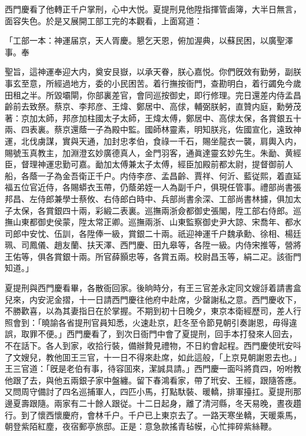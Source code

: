 西門慶看了他轉正千户掌刑，心中大悦。夏提刑見他陞指揮管鹵簿，大半日無言，面容失色。於是又展開工部工完的本觀看，上面寫道：

\begin{myquote}[\markfont]
「工部一本：神運届京，天人胥慶。懇乞天恩，俯加渥典，以蘇民困，以廣聖澤事。奉

聖旨，這神運奉迎大内，奠安艮嶽，以承天眷，朕心嘉悦。你們旣效有勤勞，副朕事玄至意，所經過地方，委的小民困苦。着行撫按衙門，查勘明白，着行蠲免今歲田租之半。所毀壩閘，你部裏差官，會同巡按御史，即行修理。完日還差内侍孟昌齡前去致祭。蔡京、李邦彦、王煒、鄭居中、高俅，輔弼朕躬，直贊内庭，勳勞茂著：京加太師，邦彦加柱國太子太師，王煒太傅，鄭居中、高俅太保，各賞銀五十兩、四表裏。蔡京還蔭一子為殿中監。國師林靈素，明知朕兆，佐國宣化，遠致神運，北伐虜謀，實與天通，加封忠孝伯，食祿一千石，賜坐龍衣一襲，肩輿入内，賜號玉真教主，加淵澄玄妙廣德真人，金門羽客，通眞達靈玄妙先生。朱勔、黄經臣，督理神運忠勤可嘉。勔加太傅兼太子太傅，經臣加殿前都太尉，提督御前人船，各蔭一子為金吾衛正千户。内侍李彦、孟昌齡、賈祥、何沂、藍従熙，着直延福五位官近侍，各賜蟒衣玉帶，仍蔭弟姪一人為副千户，俱現任管事。禮部尚書張邦昌、左侍郎兼學士蔡攸、右侍郎白時中、兵部尚書余深、工部尚書林攄，俱加太子太保，各賞銀四十兩，彩緞二表裏。巡撫兩浙僉都御史張閣，陞工部右侍郎。巡撫山東都御史侯蒙，陞太常正卿。巡撫兩浙、山東監察御史尹大諒、宋喬年、都水司郎中安忱、伍訓，各陞俸一級，賞銀二十兩。祇迎神運千户魏承勳、徐相、楊廷珮、司鳳儀、趙友蘭、扶天澤、西門慶、田九皋等，各陞一級。内侍宋推等，營將王佑等，俱各賞銀十兩。所官薛顥忠等，各賞五兩。校尉昌玉等，絹二疋。該衙門知道。」
\end{myquote}

夏提刑與西門慶看畢，各散衙回家。後晌時分，有王三官差永定同文嫂㧱着請書盒兒來，内安泥金摺，十一日請西門慶往他府中赴席，少罄謝私之意。西門慶收下，不勝歡喜，以為其妻指日在於掌握。不期到初十日晚夕，東京本衛經歷司，差人行照會到：「曉諭各省提刑官員知悉，火速赴京，赶冬至令節見朝引奏謝恩，毋得違誤，取罪不便。」西門慶看了，到次日衙門中會了夏提刑，回手本打發來人回去，不在話下。各人到家，收拾行裝，備辦贄見禮物，不日約會起程。西門慶使玳安呌了文嫂兒，教他囬王三官，十一日不得來赴席，如此這般，「上京見朝謝恩去也。」王三官道：「旣是老伯有事，待容囬來，潔誠具請。」西門慶一面呌將賁四，吩咐教他跟了去，與他五兩銀子家中盤纏。留下春鴻看家，帶了玳安、王經，跟隨答應。又問周守備討了四名巡捕軍人，四匹小馬，打點馱裝、暖轎，排軍擡扛。夏提刑那邊夏壽跟隨。兩家有二十餘人跟従。十二日起身，離了清河縣，冬天易晚，晝夜趲行。到了懷西懷慶府，會林千户。千户已上東京去了。一路天寒坐轎，天暖乘馬，朝登紫陌紅塵，夜宿郵亭旅邸。正是：意急款搖青毡幙，心忙摔碎紫絲鞭。

